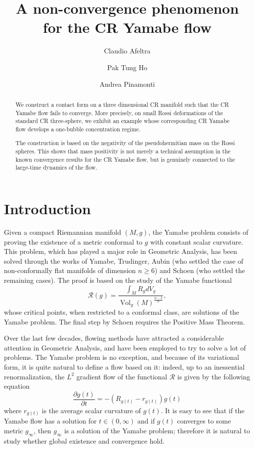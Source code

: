 \documentclass[a4paper,12pt]{amsart}
\title{A non-convergence phenomenon for the CR Yamabe flow}
\author{Claudio Afeltra}
\author{Pak Tung Ho}
\author{Andrea Pinamonti}
\newcommand{\de}{\partial}
\newcommand{\ci}[1]{\mathscr{#1}}%
\newcommand{\rosso}[1]{{\color{red}#1}}
\DeclareMathOperator{\Vol}{Vol}
\begin{document}
\begin{abstract}
We construct a contact form on a three dimensional CR manifold such that the CR Yamabe flow fails to converge. More precisely, on small Rossi deformations of the standard
CR three-sphere, we exhibit an example whose corresponding CR Yamabe flow develops a one-bubble concentration regime.

The construction is based on the negativity of the pseudohermitian
mass on the Rossi spheres. This shows that mass positivity is not merely
a technical assumption in the known convergence results for the CR
Yamabe flow, but is genuinely connected to the large-time dynamics of the
flow.
\end{abstract}
\maketitle

\section{Introduction}
Given a compact Riemannian manifold $(M,g)$, the Yamabe problem consists of proving the existence of a metric conformal to $g$ with constant scalar curvature.
This problem, which has played a major role in Geometric Analysis, has been solved through the works of Yamabe, Trudinger, Aubin (who settled the case of non-conformally flat manifolds of dimension $n\ge 6$) and Schoen (who settled the remaining cases).
The proof is based on the study of the Yamabe functional
$$\ci{R}(g) = \frac{\int_MR_gdV_g}{\Vol_g(M)^{\frac{n-2}{n}}},$$
whose critical points, when restricted to a conformal class, are solutions of the Yamabe problem.
The final step by Schoen requires the Positive Mass Theorem.%

Over the last few decades, flowing methods have attracted a considerable attention in Geometric Analysis, and have been employed to try to solve a lot of problems. The Yamabe problem is no exception, and because of its variational form, it is quite natural to define a flow based on it: indeed, up to an inessential renormalization, the $L^2$  gradient flow of the functional $\ci{R}$ is given by the following equation
$$\frac{\de g(t)}{\de t} = -(R_{g(t)}-r_{g(t)})g(t)$$
where $r_{g(t)}$ is the average scalar curvature of $g(t)$.
It is easy to see that if the Yamabe flow has a solution for $t\in(0,\infty)$ and if $g(t)$ converges to some metric $g_{\infty}$, then $g_{\infty}$ is a solution of the Yamabe problem; therefore it is natural to study whether global existence and convergence hold.
\end{document}
